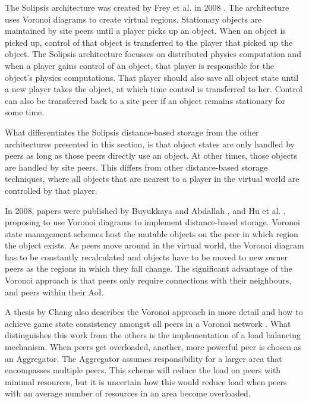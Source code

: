 The Solipsis architecture was created by Frey et al. in 2008 \cite{solipsis}. The architecture uses Voronoi diagrams to create virtual regions. Stationary objects are maintained by site peers until a player picks up an object. When an object is picked up, control of that object is transferred to the player that picked up the object. The Solipsis architecture focusses on distributed physics computation and when a player gains control of an object, that player is responsible for the object's physics computations. That player should also save all object state until a new player takes the object, at which time control is transferred to her. Control can also be transferred back to a site peer if an object remains stationary for some
time.

What differentiates the Solipsis distance-based storage from the other architectures presented in this section, is that object states are only handled by peers as long as those peers directly use an object. At other times, those objects are handled by site peers. This differs from other distance-based storage techniques, where all objects that are nearest to a player in the virtual world are controlled by that player.

In 2008, papers were published by Buyukkaya and Abdallah \cite{Buyukkaya_voronoi_state_management}, and Hu et al. \cite{Hu_voronoi_IM}, proposing to use Voronoi diagrams \cite{voronoi_diagrams_survey} to implement distance-based storage. Voronoi state management schemes host the mutable objects on the peer in which region the object exists. As peers move around in the virtual world, the Voronoi diagram has to be constantly recalculated and objects have to be moved to new owner peers as the regions in which they fall change. The significant advantage of the Voronoi approach is that peers only require connections with their neighbours, and peers within their AoI.

A thesis by Chang also describes the Voronoi approach in more detail and how to achieve game state consistency amongst all peers in a Voronoi network \cite{Chang_Voronoi_state_management_masters}. What distinguishes this work from the others is the implementation of a load balancing mechanism. When peers get overloaded, another, more powerful peer is chosen as an Aggregator. The Aggregator assumes responsibility for a larger area that encompasses multiple peers. This scheme will reduce the load on peers with minimal resources, but it is uncertain how this would reduce load when peers with an average number of resources in an area become overloaded.

